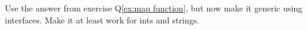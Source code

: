 \begin{Exercise}[title={Map function with interfaces},difficulty=6]
\label{ex:map function interfaces}
\Question
Use the answer from exercise Q\ref{ex:map function}, but now
make it generic using interfaces. Make it at least work for
ints and strings.
\end{Exercise}

\begin{Answer}
\Question

\end{Answer}


